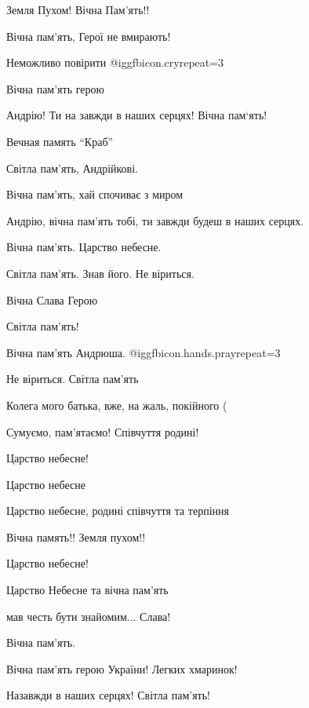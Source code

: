 \begin{itemize}
Земля Пухом! Вічна Пам'ять!!

Вічна пам’ять, Герої не вмирають!

Неможливо повірити  @igg{fbicon.cry}{repeat=3} 

Вічна пам'ять герою

Андрію! Ти на завжди в наших серцях! Вічна пам`ять!

Вечная память \enquote{Краб}

Світла пам'ять, Андрійкові.

Вічна пам'ять, хай спочиває з миром

Андрію, вічна пам'ять тобі, ти завжди будеш в наших серцях.

Вічна пам'ять. Царство небесне.

Світла пам'ять. Знав його. Не віриться.

Вічна Слава Герою

Світла пам'ять!

Вічна пам'ять Андрюша.  @igg{fbicon.hands.pray}{repeat=3} 

Не віриться. Світла пам'ять

Колега мого батька, вже, на жаль, покійного (

Сумуємо, пам’ятаємо! Співчуття родині!

Царство небесне!

Царство небесне

Царство небесне, родині співчуття та терпіння

Вічна память!! Земля пухом!!

Царство небесне!

Царство Небесне та вічна пам'ять

мав честь бути знайомим... Слава!

Вічна пам'ять.

Вічна пам'ять герою України! Легких хмаринок!

Назавжди в наших серцях! Світла пам'ять!


\end{itemize}
